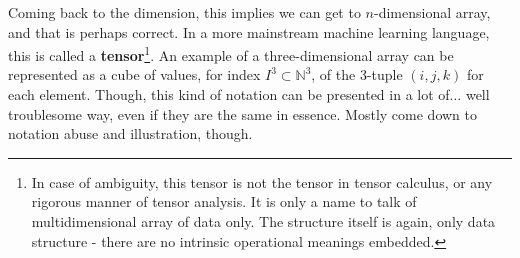Coming back to the dimension, this implies we can get to $n$-dimensional array, and that is perhaps correct. In a more mainstream machine learning language, this is called a \textbf{tensor}\footnote{In case of ambiguity, this tensor is not the tensor in tensor calculus, or any rigorous manner of tensor analysis. It is only a name to talk of multidimensional array of data only. The structure itself is again, only data structure - there are no intrinsic operational meanings embedded.}. An example of a three-dimensional array can be represented as a cube of values, for index $I^{3}\subset \mathbb{N}^{3}$, of the 3-tuple $(i,j,k)$ for each element. Though, this kind of notation can be presented in a lot of... well troublesome way, even if they are the same in essence. Mostly come down to notation abuse and illustration, though. 
\begin{center}
\end{center}
